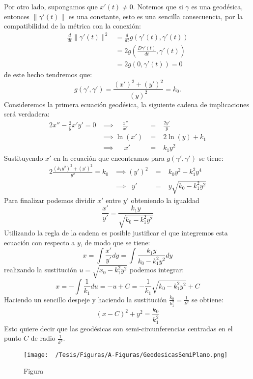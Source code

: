 \begin{example}
	Por otro lado, supongamos que $x'(t) \neq 0$. Notemos que si $\gamma$ es una geodésica, entonces $\|\gamma'(t)\|$ es una constante, esto es una sencilla consecuencia, por la compatibilidad de la métrica con la conexión:
	\begin{align*}
		\frac{d}{dt} \|\gamma'(t)\|^2 & = \frac{d}{dt} g(\gamma'(t),\gamma'(t))   \\
		                              & = 2 g(\frac{D\gamma'(t)}{dt}, \gamma'(t)) \\
		                              & = 2 g(0, \gamma'(t)) = 0
	\end{align*}
	de este hecho tendremos que:
	\[
		g(\gamma', \gamma') = \frac{(x')^{2} + (y')^{2}}{(y)^{2}} = k_0.
	\]
	Consideremos la primera ecuación geodésica, la siguiente cadena de implicaciones será verdadera:
	\begin{alignat*}{2}
		x'' - \frac{2}{y} x' y' =  0 & \implies \quad \frac{x''}{x'} & \; = \; & \frac{2y'}{y}  \\
		                             & \implies \ln(x')              & \; = \; & 2 \ln(y) + k_1 \\
		                             & \implies \quad\; x'           & \; = \; & k_{1}y^{2}
	\end{alignat*}
	Sustituyendo $x'$ en la ecuación que encontramos para $g(\gamma',\gamma')$ se tiene:
	\begin{alignat*}{2}
		\frac{(k_1 y^2)^2 + (y')^2}{y^2} = k_0 & \implies (y')^2  & \; = \; & k_0 y^{2} - k_1^2 y^4      \\
		                                       & \implies \;\; y' & \; = \; & y \sqrt{k_0 - k_1^2 y^{2}}
	\end{alignat*}
	Para finalizar podemos dividir $x'$ entre $y'$ obteniendo la igualdad
	\[
		\frac{x'}{y'} = \frac{k_1 y}{\sqrt{k_0 - k_1^2y^2}}
	\]
	Utilizando la regla de la cadena es posible justificar el que integremos esta ecuación con respecto a $y$, de modo que se tiene:
	\[
		x = \int \frac{x'}{y'} dy = \int \frac{k_1 y}{k_0 - k_{1}^{2}y^{2}} dy
	\]
	realizando la sustitución $u = \sqrt{x_0 - k_{1}^{2}y^{2}}$ podemos integrar:
	\[
		x = -\int \frac{1}{k_1} du = -u + C = -\frac{1}{k_1} \sqrt{k_0 - k_{1}^{2}y^{2}} + C
	\]
	Haciendo un sencillo despeje y haciendo la sustitución $\frac{k_0}{k_1^2} = \frac{1}{k^2}$ se obtiene:
	\[
		(x - C)^{2} + y^{2} = \frac{k_0}{k_{1}^{2}}
	\]
	Esto quiere decir que las geodésicas son semi-circunferencias centradas en el punto $C$ de radio $\frac{1}{k^2}$.
\end{example}

\begin{figure}[h]
	\centering
	\texttt{[image: ~/Tesis/Figuras/A-Figuras/GeodesicasSemiPlano.png]}
	\caption{Figura}
\end{figure}
